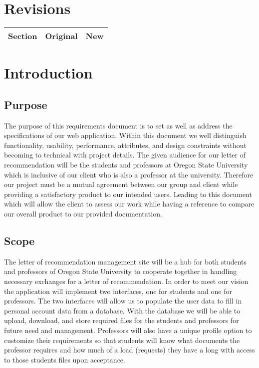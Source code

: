 \documentclass[onecolumn, draftclsnofoot,10pt, compsoc]{IEEEtran}
\begin{document}
\section*{Revisions}

\begin{tabu} to 
        \hline
        \textbf{Section} & \textbf{Original} & \textbf{New}\\
        \hline
        
       
\end{tabu}


\section{Introduction}
\subsection{Purpose}
The purpose of this requirements document is to set as well as address the specifications of our web application. Within this document we well distinguish functionality, usability, performance, attributes, and design constraints without becoming to technical with project details. The given audience for our letter of recommendation will be the students and professors at Oregon State University which is inclusive of our client who is also a professor at the university. Therefore our project must be a mutual agreement between our group and client while providing a satisfactory product to our intended users. Leading to this document which will allow the client to assess our work while having a reference to compare our overall product to our provided documentation. 

\subsection{Scope}
The letter of recommendation management site will be a hub for both students and professors of Oregon State University to cooperate together in handling necessary exchanges for a letter of recommendation. In order to meet our vision the application will implement two interfaces, one for students and one for professors. The two interfaces will allow us to populate the user data to fill in personal account data from a database. With the database we will be able to upload, download, and store required files for the students and professors for future need and management. Professors will also have a unique profile option to customize their requirements so that students will know what documents the professor requires and how much of a load (requests) they have a long with access to those students files upon acceptance. 
\end{document}
